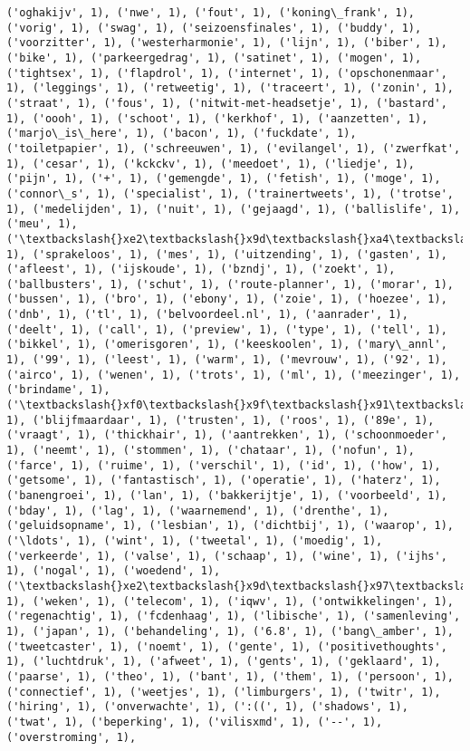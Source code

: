 \documentclass{article}
\begin{document}
\begin{Verbatim}[commandchars=\\\{\}]
('oghakijv', 1), ('nwe', 1), ('fout', 1), ('koning\_frank', 1), ('vorig', 1), ('swag', 1), ('seizoensfinales', 1), ('buddy', 1), ('voorzitter', 1), ('westerharmonie', 1), ('lijn', 1), ('biber', 1), ('bike', 1), ('parkeergedrag', 1), ('satinet', 1), ('mogen', 1), ('tightsex', 1), ('flapdrol', 1), ('internet', 1), ('opschonenmaar', 1), ('leggings', 1), ('retweetig', 1), ('traceert', 1), ('zonin', 1), ('straat', 1), ('fous', 1), ('nitwit-met-headsetje', 1), ('bastard', 1), ('oooh', 1), ('schoot', 1), ('kerkhof', 1), ('aanzetten', 1), ('marjo\_is\_here', 1), ('bacon', 1), ('fuckdate', 1), ('toiletpapier', 1), ('schreeuwen', 1), ('evilangel', 1), ('zwerfkat', 1), ('cesar', 1), ('kckckv', 1), ('meedoet', 1), ('liedje', 1), ('pijn', 1), ('+', 1), ('gemengde', 1), ('fetish', 1), ('moge', 1), ('connor\_s', 1), ('specialist', 1), ('trainertweets', 1), ('trotse', 1), ('medelijden', 1), ('nuit', 1), ('gejaagd', 1), ('ballislife', 1), ('meu', 1), ('\textbackslash{}xe2\textbackslash{}x9d\textbackslash{}xa4\textbackslash{}xef\textbackslash{}xb8\textbackslash{}x8f', 1), ('sprakeloos', 1), ('mes', 1), ('uitzending', 1), ('gasten', 1), ('afleest', 1), ('ijskoude', 1), ('bzndj', 1), ('zoekt', 1), ('ballbusters', 1), ('schut', 1), ('route-planner', 1), ('morar', 1), ('bussen', 1), ('bro', 1), ('ebony', 1), ('zoie', 1), ('hoezee', 1), ('dnb', 1), ('tl', 1), ('belvoordeel.nl', 1), ('aanrader', 1), ('deelt', 1), ('call', 1), ('preview', 1), ('type', 1), ('tell', 1), ('bikkel', 1), ('omerisgoren', 1), ('keeskoolen', 1), ('mary\_annl', 1), ('99', 1), ('leest', 1), ('warm', 1), ('mevrouw', 1), ('92', 1), ('airco', 1), ('wenen', 1), ('trots', 1), ('ml', 1), ('meezinger', 1), ('brindame', 1), ('\textbackslash{}xf0\textbackslash{}x9f\textbackslash{}x91\textbackslash{}x8d\textbackslash{}xf0\textbackslash{}x9f\textbackslash{}x91\textbackslash{}x8d', 1), ('blijfmaardaar', 1), ('trusten', 1), ('roos', 1), ('89e', 1), ('vraagt', 1), ('thickhair', 1), ('aantrekken', 1), ('schoonmoeder', 1), ('neemt', 1), ('stommen', 1), ('chataar', 1), ('nofun', 1), ('farce', 1), ('ruime', 1), ('verschil', 1), ('id', 1), ('how', 1), ('getsome', 1), ('fantastisch', 1), ('operatie', 1), ('haterz', 1), ('banengroei', 1), ('lan', 1), ('bakkerijtje', 1), ('voorbeeld', 1), ('bday', 1), ('lag', 1), ('waarnemend', 1), ('drenthe', 1), ('geluidsopname', 1), ('lesbian', 1), ('dichtbij', 1), ('waarop', 1), ('\ldots', 1), ('wint', 1), ('tweetal', 1), ('moedig', 1), ('verkeerde', 1), ('valse', 1), ('schaap', 1), ('wine', 1), ('ijhs', 1), ('nogal', 1), ('woedend', 1), ('\textbackslash{}xe2\textbackslash{}x9d\textbackslash{}x97\textbackslash{}xef\textbackslash{}xb8\textbackslash{}x8f', 1), ('weken', 1), ('telecom', 1), ('iqwv', 1), ('ontwikkelingen', 1), ('regenachtig', 1), ('fcdenhaag', 1), ('libische', 1), ('samenleving', 1), ('japan', 1), ('behandeling', 1), ('6.8', 1), ('bang\_amber', 1), ('tweetcaster', 1), ('noemt', 1), ('gente', 1), ('positivethoughts', 1), ('luchtdruk', 1), ('afweet', 1), ('gents', 1), ('geklaard', 1), ('paarse', 1), ('theo', 1), ('bant', 1), ('them', 1), ('persoon', 1), ('connectief', 1), ('weetjes', 1), ('limburgers', 1), ('twitr', 1), ('hiring', 1), ('onverwachte', 1), (':((', 1), ('shadows', 1), ('twat', 1), ('beperking', 1), ('vilisxmd', 1), ('--', 1), ('overstroming', 1), 
\end{Verbatim}
\end{document}
